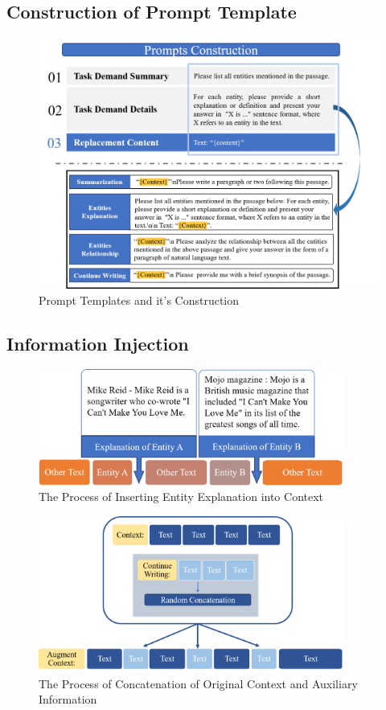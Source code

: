\documentclass[mathematics,article,submit,moreauthors]{Definitions/mdpi}
\newcommand{\1}[1]{\mathds{1}\left[#1\right]}
\begin{document}
\subsection{Construction of Prompt Template}
\label{sec:prompt_construction}
	\begin{figure}[H]
		\centering
		\includegraphics[width=14.5cm]{Prompts_construction.png}
		\caption{Prompt Templates and it's Construction}
		\label{fig:prompt_template}
	\end{figure}   
	
\subsection{Information Injection}
\label{sec:information_injection}
\begin{figure}[H]
	\centering
	\includegraphics[width=10cm]{EntityInsert.png}
	\caption{The Process of Inserting Entity Explanation into Context}
	\label{fig:entity_insertion}
\end{figure}   

\begin{figure}[H]
	\centering
	\includegraphics[width=10cm]{RandomConcat.png}
	\caption{The Process of Concatenation of Original Context and Auxiliary Information}
	\label{fig:random_concatenate}
\end{figure}  
\end{document}
